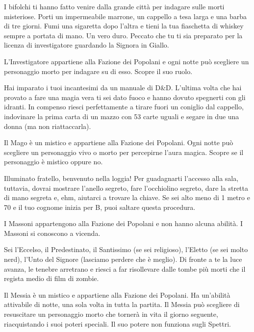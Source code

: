 {{{{{{{{{{{{{{{%
I bifolchi ti hanno fatto venire dalla grande città per indagare sulle morti misteriose. Porti un impermeabile marrone, un cappello a tesa larga e una barba di tre giorni. Fumi una sigaretta dopo l'altra e tieni la tua fiaschetta di whiskey sempre a portata di mano. Un vero duro. Peccato che tu ti sia preparato per la licenza di investigatore guardando la Signora in Giallo.

L'Investigatore appartiene alla Fazione dei Popolani e ogni notte può scegliere un personaggio morto per indagare su di esso. Scopre il suo ruolo.{%


{%
Hai imparato i tuoi incantesimi da un manuale di D\&D. L'ultima volta che hai provato a fare una magia vera ti sei dato fuoco e hanno dovuto spegnerti con gli idranti. In compenso riesci perfettamente a tirare fuori un coniglio dal cappello, indovinare la prima carta di un mazzo con 53 carte uguali e segare in due una donna (ma non riattaccarla).

Il Mago è un mistico e appartiene alla Fazione dei Popolani. Ogni notte può scegliere un personaggio vivo o morto per percepirne l'aura magica. Scopre se il personaggio è mistico oppure no.
{%


{%
Illuminato fratello, benvenuto nella loggia! Per guadagnarti l'accesso alla sala, tuttavia, dovrai mostrare l'anello segreto, fare l'occhiolino segreto, dare la stretta di mano segreta e, ehm, aiutarci a trovare la chiave. Se sei alto meno di 1 metro e 70 e il tuo cognome inizia per B, puoi saltare questa procedura.

I Massoni appartengono alla Fazione dei Popolani e non hanno alcuna abilità. I Massoni si conoscono a vicenda.
{%


{%
Sei l'Eccelso, il Predestinato, il Santissimo (se sei religioso), l'Eletto (se sei molto nerd), l'Unto del Signore (lasciamo perdere che è meglio). Di fronte a te la luce avanza, le tenebre arretrano e riesci a far risollevare dalle tombe più morti che il regista medio di film di zombie.

Il Messia è un mistico e appartiene alla Fazione dei Popolani. Ha un'abilità attivabile di notte, una sola volta in tutta la partita. Il Messia può scegliere di resuscitare un personaggio morto che tornerà in vita il giorno seguente, riacquistando i suoi poteri speciali. Il suo potere non funziona sugli Spettri.
{%



}}}}}}}}}}}}}}}}}}}}}}
